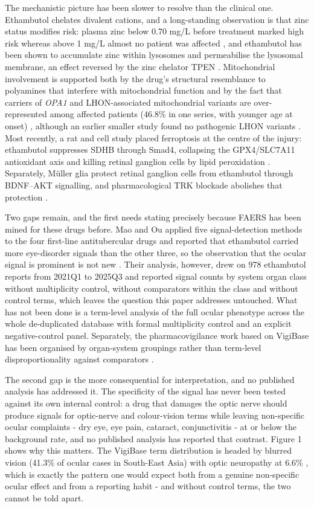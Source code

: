 \documentclass[utf8]{FrontiersinVancouver}
\begin{document}
The mechanistic picture has been slower to resolve than the clinical one. Ethambutol chelates divalent cations, and a long-standing observation is that zinc status modifies risk: plasma zinc below 0.70 mg/L before treatment marked high risk whereas above 1 mg/L almost no patient was affected \citep{e1978}, and ethambutol has been shown to accumulate zinc within lysosomes and permeabilise the lysosomal membrane, an effect reversed by the zinc chelator TPEN \citep{h2009}. Mitochondrial involvement is supported both by the drug's structural resemblance to polyamines that interfere with mitochondrial function and by the fact that carriers of \textit{OPA1} and LHON-associated mitochondrial variants are over-represented among affected patients (46.8\% in one series, with younger age at onset) \citep{xh2021}, although an earlier smaller study found no pathogenic LHON variants \citep{jm2003}. Most recently, a rat and cell study placed ferroptosis at the centre of the injury: ethambutol suppresses SDHB through Smad4, collapsing the GPX4/SLC7A11 antioxidant axis and killing retinal ganglion cells by lipid peroxidation \citep{q2026}. Separately, Müller glia protect retinal ganglion cells from ethambutol through BDNF--AKT signalling, and pharmacological TRK blockade abolishes that protection \citep{hc2025}.

Two gaps remain, and the first needs stating precisely because FAERS has been mined for these drugs before. Mao and Ou applied five signal-detection methods to the four first-line antitubercular drugs and reported that ethambutol carried more eye-disorder signals than the other three, so the observation that the ocular signal is prominent is not new \citep{q2026b}. Their analysis, however, drew on 978 ethambutol reports from 2021Q1 to 2025Q3 and reported signal counts by system organ class without multiplicity control, without comparators within the class and without control terms, which leaves the question this paper addresses untouched. What has not been done is a term-level analysis of the full ocular phenotype across the whole de-duplicated database with formal multiplicity control and an explicit negative-control panel. Separately, the pharmacovigilance work based on VigiBase has been organised by organ-system groupings rather than term-level disproportionality against comparators \citep{j2026}.

The second gap is the more consequential for interpretation, and no published analysis has addressed it. The specificity of the signal has never been tested against its own internal control: a drug that damages the optic nerve should produce signals for optic-nerve and colour-vision terms while leaving non-specific ocular complaints - dry eye, eye pain, cataract, conjunctivitis - at or below the background rate, and no published analysis has reported that contrast. Figure 1 shows why this matters. The VigiBase term distribution is headed by blurred vision (41.3\% of ocular cases in South-East Asia) with optic neuropathy at 6.6\% \citep{j2026}, which is exactly the pattern one would expect both from a genuine non-specific ocular effect and from a reporting habit - and without control terms, the two cannot be told apart.
\end{document}
